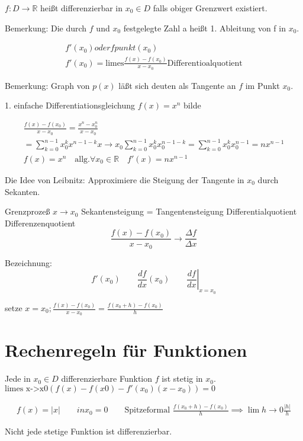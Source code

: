 \begin{definition}[1. Ableitung]
	\( f:D\rightarrow \mathbb{R} \) heißt differenzierbar in \( x_0 \in D \) falls obiger Grenzwert existiert.
\end{definition}
Bemerkung: Die durch \( f \) und \( x_0 \) festgelegte Zahl a heißt 1. Ableitung von f in \( x_0 \).

\begin{align*}
	f'(x_0) oder fpunkt(x_0) \\
	f'(x_0) = \text{limes} \frac{f(x)-f(x_0)}{x-x_0} \text{Differentioalquotient}
\end{align*}


Bemerkung: Graph von \( p(x) \) läßt sich deuten als Tangente an \( f \) im Punkt \( x_0 \).

1. einfache Differentiationsgleichung \( f(x)=x^n \) bilde

\begin{align*}
	\frac{f(x)-f(x_0)}{x-x_0}=\frac{x^n-x_0^n}{x-x_0} \\
	= \sum_{k=0}^{n-1}x_0^kx^{n-1-k} x \rightarrow x_0 \sum_{k=0}^{n-1}x_0^kx_0^{n-1-k} = \sum_{k=0}^{n-1}x_0^kx_0^{n-1} = nx^{n-1} \\
	f(x)=x^n \quad \text{allg.} \forall x_0 \in \mathbb{R} \quad f'(x)=nx^{n-1} 
\end{align*}

Die Idee von Leibnitz: Approximiere die Steigung der Tangente in \( x_0 \) durch Sekanten.


Grenzprozeß \( x \rightarrow x_0 \) Sekantensteigung = Tangentensteigung
Differentialquotient Differenzenquotient
\[
	\frac{f(x)-f(x_0)}{x-x_0} \rightarrow \frac{\Delta f}{\Delta x}
\]

Bezeichnung:
\[
	f'(x_0) \qquad \frac{df}{dx}(x_0) \qquad \left.\frac{df}{dx}\right|_{x=x_0}
\]

setze \( x = x_0; \frac{f(x)-f(x_0)}{x-x_0} = \frac{f(x_0+h)-f(x_0)}{h}\)

\section{Rechenregeln für Funktionen}
\label{sec:rechenregeln_f_funktionen}

\begin{theorem}[1. Aussage]
	Jede in \( x_0 \in D \) differenzierbare Funktion \( f \) ist stetig in \( x_0\).
	\( \text{limes x->x0} (f(x)-f(x0)-f'(x_0)(x-x_0)) = 0 \)
\end{theorem}
\begin{align*}
	f(x)=|x| \qquad in x_0=0 \qquad \text{Spitze}
	\text{formal } \frac{f(x_0+h)-f(x_0)}{h} \implies \lim{h \rightarrow 0}\frac{|h|}{h} 
\end{align*}
\begin{theorem}[2. Aussage]
	Nicht jede stetige Funktion ist differenzierbar.

\end{theorem}

